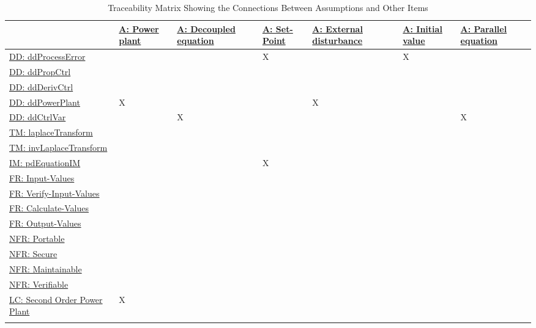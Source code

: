 \documentclass[12pt]{article}
\begin{document}
\begin{longtable}{l l l l l l l}
\toprule
\textbf{} & \textbf{\hyperref[pwrPlant]{A: Power plant}} & \textbf{\hyperref[decoupled]{A: Decoupled equation}} & \textbf{\hyperref[setPoint]{A: Set-Point}} & \textbf{\hyperref[externalDistub]{A: External disturbance}} & \textbf{\hyperref[initialValue]{A: Initial value}} & \textbf{\hyperref[parallelEq]{A: Parallel equation}}
\\
\midrule
\endhead
\hyperref[DD:ddProcessError]{DD: ddProcessError} &  &  & X &  & X & 
\\
\hyperref[DD:ddPropCtrl]{DD: ddPropCtrl} &  &  &  &  &  & 
\\
\hyperref[DD:ddDerivCtrl]{DD: ddDerivCtrl} &  &  &  &  &  & 
\\
\hyperref[DD:ddPowerPlant]{DD: ddPowerPlant} & X &  &  & X &  & 
\\
\hyperref[DD:ddCtrlVar]{DD: ddCtrlVar} &  & X &  &  &  & X
\\
\hyperref[TM:laplaceTransform]{TM: laplaceTransform} &  &  &  &  &  & 
\\
\hyperref[TM:invLaplaceTransform]{TM: invLaplaceTransform} &  &  &  &  &  & 
\\
\hyperref[IM:pdEquationIM]{IM: pdEquationIM} &  &  & X &  &  & 
\\
\hyperref[inputValues]{FR: Input-Values} &  &  &  &  &  & 
\\
\hyperref[verifyInputs]{FR: Verify-Input-Values} &  &  &  &  &  & 
\\
\hyperref[calculateValues]{FR: Calculate-Values} &  &  &  &  &  & 
\\
\hyperref[outputValues]{FR: Output-Values} &  &  &  &  &  & 
\\
\hyperref[portability]{NFR: Portable} &  &  &  &  &  & 
\\
\hyperref[security]{NFR: Secure} &  &  &  &  &  & 
\\
\hyperref[maintainability]{NFR: Maintainable} &  &  &  &  &  & 
\\
\hyperref[verifiability]{NFR: Verifiable} &  &  &  &  &  & 
\\
\hyperref[likeChgIC]{LC: Second Order Power Plant} & X &  &  &  &  & 
\\
\bottomrule
\caption{Traceability Matrix Showing the Connections Between Assumptions and Other Items}
\label{Table:TraceMatAvsAll}
\end{longtable}
\end{document}
